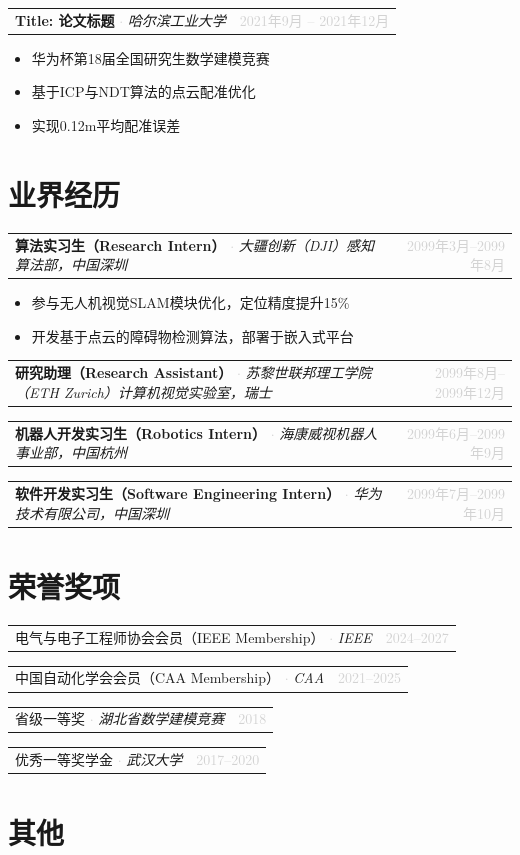 \documentclass[10pt, letterpaper]{article}
\makeatletter
\newcommand{\entry}[3]{%
  \begin{tabularx}{\linewidth}{@{}X r@{}}
    \textbf{#1} \textcolor{lightgray}{$\cdot$} \textit{#2} &
    {\small\textcolor{lightgray}{#3}}
  \end{tabularx}\vspace{1pt}%
}
\newcommand{\honorrow}[3]{%
  \begin{tabularx}{\linewidth}{@{}X r@{}}
    #1 \textcolor{lightgray}{$\cdot$} \textit{\small #2} & {\small\textcolor{lightgray}{#3}}
  \end{tabularx}\vspace{1pt}%
}
\makeatother
\begin{document}
\entry{Title: 论文标题}{哈尔滨工业大学}{2021年9月 -- 2021年12月}
\begin{itemize}
\item 华为杯第18届全国研究生数学建模竞赛
\item 基于ICP与NDT算法的点云配准优化
\item 实现0.12m平均配准误差
\end{itemize}
\section{业界经历}

\entry{算法实习生（Research Intern）}{大疆创新（DJI）感知算法部，中国深圳}{2099年3月--2099年8月}

\begin{itemize}
\item 参与无人机视觉SLAM模块优化，定位精度提升15\%
\item 开发基于点云的障碍物检测算法，部署于嵌入式平台
\end{itemize}

\entry{研究助理（Research Assistant）}{苏黎世联邦理工学院（ETH Zurich）计算机视觉实验室，瑞士}{2099年8月--2099年12月}

\entry{机器人开发实习生（Robotics Intern）}{海康威视机器人事业部，中国杭州}{2099年6月--2099年9月}

\entry{软件开发实习生（Software Engineering Intern）}{华为技术有限公司，中国深圳}{2099年7月--2099年10月}
\section{荣誉奖项}
\honorrow{电气与电子工程师协会会员（IEEE Membership）}{IEEE}{2024--2027}
\honorrow{中国自动化学会会员（CAA Membership）}{CAA}{2021--2025}
\honorrow{省级一等奖}{湖北省数学建模竞赛}{2018}
\honorrow{优秀一等奖学金}{武汉大学}{2017--2020}

\section{其他}
\end{document}
